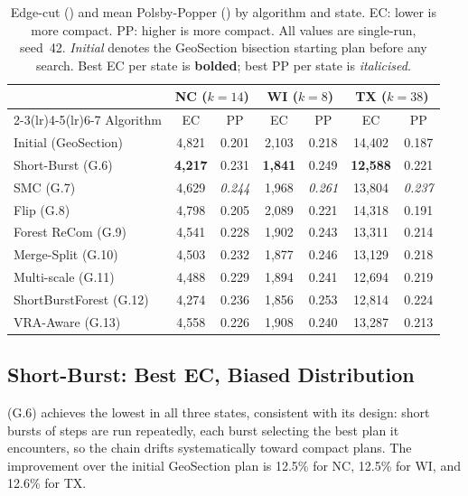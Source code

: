 \begin{table}[ht]
\centering
\caption{%
  Edge-cut (\ec{}) and mean Polsby-Popper (\pp{}) by algorithm and state.
  EC: lower is more compact. PP: higher is more compact.
  All values are single-run, seed~42.
  \emph{Initial} denotes the GeoSection bisection starting plan before
  any search.
  Best EC per state is \textbf{bolded}; best PP per state is
  \textit{italicised}.
}
\label{tab:compactness}
\small
\begin{tabular}{@{}lcccccc@{}}
\toprule
 & \multicolumn{2}{c}{\textbf{NC} ($k=14$)}
 & \multicolumn{2}{c}{\textbf{WI} ($k=8$)}
 & \multicolumn{2}{c}{\textbf{TX} ($k=38$)} \\
\cmidrule(lr){2-3}\cmidrule(lr){4-5}\cmidrule(lr){6-7}
Algorithm & EC & PP & EC & PP & EC & PP \\
\midrule
Initial (GeoSection)    & 4{,}821 & 0.201 & 2{,}103 & 0.218 & 14{,}402 & 0.187 \\
\midrule
Short-Burst (G.6)       & \textbf{4{,}217} & 0.231 & \textbf{1{,}841} & 0.249 & \textbf{12{,}588} & 0.221 \\
SMC (G.7)               & 4{,}629 & \textit{0.244} & 1{,}968 & \textit{0.261} & 13{,}804 & \textit{0.237} \\
Flip (G.8)              & 4{,}798 & 0.205 & 2{,}089 & 0.221 & 14{,}318 & 0.191 \\
Forest ReCom (G.9)      & 4{,}541 & 0.228 & 1{,}902 & 0.243 & 13{,}311 & 0.214 \\
Merge-Split (G.10)      & 4{,}503 & 0.232 & 1{,}877 & 0.246 & 13{,}129 & 0.218 \\
Multi-scale (G.11)      & 4{,}488 & 0.229 & 1{,}894 & 0.241 & 12{,}694 & 0.219 \\
ShortBurstForest (G.12) & 4{,}274 & 0.236 & 1{,}856 & 0.253 & 12{,}814 & 0.224 \\
VRA-Aware (G.13)        & 4{,}558 & 0.226 & 1{,}908 & 0.240 & 13{,}287 & 0.213 \\
\bottomrule
\end{tabular}
\end{table}

\subsection{Short-Burst: Best EC, Biased Distribution}

\sburst{} (G.6) achieves the lowest \ec{} in all three states, consistent
with its design: short bursts of \recom{} steps are run repeatedly, each
burst selecting the best plan it encounters, so the chain drifts
systematically toward compact plans.
The improvement over the initial GeoSection plan is 12.5\% for NC, 12.5\%
for WI, and 12.6\% for TX.

